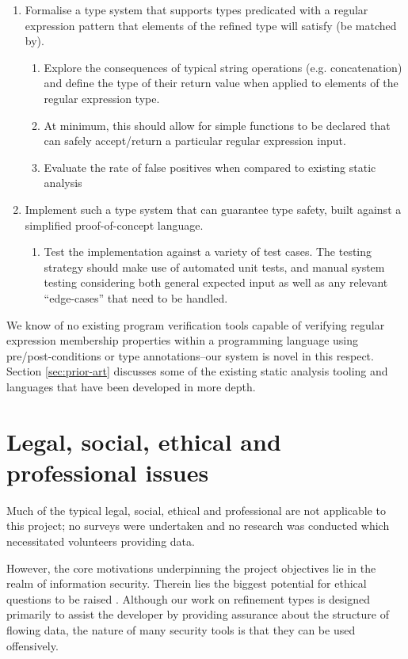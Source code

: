\begin{enumerate}
    \item Formalise a type system that supports types predicated with a regular expression pattern that elements of the refined type will satisfy (be matched by).
    \begin{enumerate}
        \item Explore the consequences of typical string operations (e.g. concatenation) and define the type of
        their return value when applied to elements of the regular expression type.

        \item At minimum, this should allow for simple functions to be declared that can safely accept/return a
        particular regular expression input.
        \item Evaluate the rate of false positives when compared to existing static analysis
    \end{enumerate}
    \item Implement such a type system that can guarantee type safety, built against a simplified proof-of-concept
    language.
    \begin{enumerate}
        \item Test the implementation against a variety of test cases. The testing strategy should make use of
        automated unit tests, and manual system testing considering both general expected input as well as
        any relevant ``edge-cases'' that need to be handled.
    \end{enumerate}
\end{enumerate}

We know of no existing program verification tools capable of verifying regular expression membership properties
within a programming language using pre/post-conditions or type annotations--our system is novel in this respect.
Section \ref{sec:prior-art} discusses some of the existing static analysis tooling and languages that have been
developed in more depth.

\section{Legal, social, ethical and professional issues}

Much of the typical legal, social, ethical and professional are not applicable to this project;
no surveys were undertaken and no research was conducted which necessitated volunteers providing data.

However, the core motivations underpinning the project objectives lie in the realm of information security.
Therein lies the biggest potential for ethical questions to be raised \citep{dark2008ethics}.
Although our work on refinement types is designed primarily to assist the developer by providing assurance about the
structure of flowing data, the nature of many security tools is that they can be used offensively.

